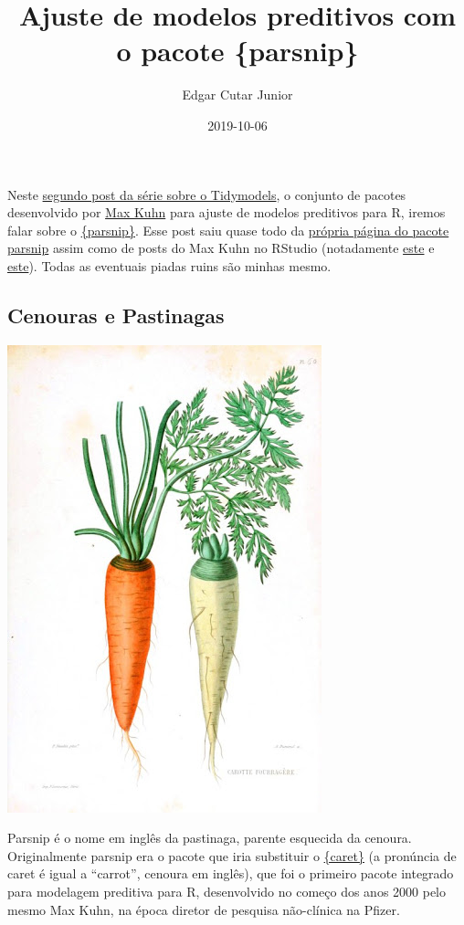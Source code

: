 \documentclass[
]{article}
\title{Ajuste de modelos preditivos com o pacote \{parsnip\}}
\author{Edgar Cutar Junior}
\date{2019-10-06}
\begin{document}
\maketitle

Neste
\href{https://www.linkedin.com/pulse/pr\%C3\%A9-processamento-de-dados-r-com-o-pacote-recipes-edgar-cutar-junior/}{segundo
post da série sobre o Tidymodels}, o conjunto de pacotes desenvolvido
por \href{twitter.com/topepos}{Max Kuhn} para ajuste de modelos
preditivos para R, iremos falar sobre o
\href{https://tidymodels.github.io/parsnip/}{\{parsnip\}}. Esse post
saiu quase todo da \href{https://tidymodels.github.io/parsnip/}{própria
página do pacote parsnip} assim como de posts do Max Kuhn no RStudio
(notadamente
\href{https://www.tidyverse.org/blog/2019/04/parsnip-internals/}{este} e
\href{https://www.tidyverse.org/blog/2018/11/parsnip-0-0-1/}{este}).
Todas as eventuais piadas ruins são minhas mesmo.

\hypertarget{cenouras-e-pastinagas}{%
\subsection{Cenouras e Pastinagas}\label{cenouras-e-pastinagas}}

\includegraphics{Parsnip_vs_carrot.jpg}

Parsnip é o nome em inglês da pastinaga, parente esquecida da cenoura.
Originalmente parsnip era o pacote que iria substituir o
\href{http://caret.r-forge.r-project.org/}{\{caret\}} (a pronúncia de
caret é igual a ``carrot'', cenoura em inglês), que foi o primeiro
pacote integrado para modelagem preditiva para R, desenvolvido no começo
dos anos 2000 pelo mesmo Max Kuhn, na época diretor de pesquisa
não-clínica na Pfizer.
\end{document}
